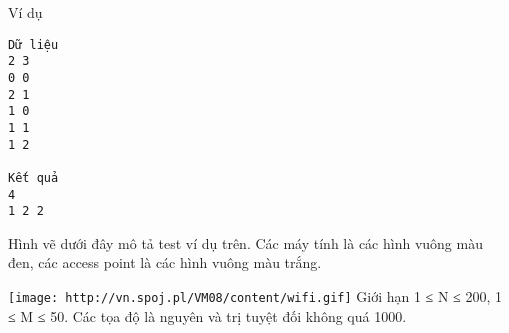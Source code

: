 Ví dụ
\begin{verbatim}
Dữ liệu
2 3
0 0
2 1
1 0
1 1
1 2

Kết quả
4
1 2 2
\end{verbatim}

Hình vẽ dưới đây mô tả test ví dụ trên. Các máy tính là các hình vuông màu đen, các access point là các hình vuông màu trắng.


\texttt{[image: http://vn.spoj.pl/VM08/content/wifi.gif]}
Giới hạn
1 ≤ N ≤ 200, 1 ≤ M ≤ 50. Các tọa độ là nguyên và trị tuyệt đối không quá 1000.